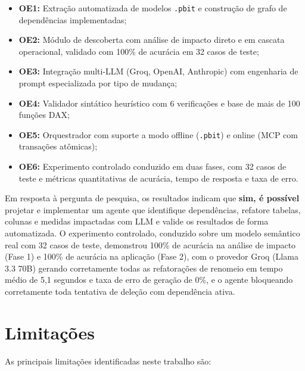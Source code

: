 \documentclass[
    12pt,               %
    openright,          %
    oneside,            %
    a4paper,            %
    chapter=TITLE,      %
    section=TITLE,      %
    brazil              %
]{abntex2}
\begin{document}
\begin{itemize}
    \item \textbf{OE1:} Extração automatizada de modelos \texttt{.pbit} e construção de grafo de dependências implementadas;
    \item \textbf{OE2:} Módulo de descoberta com análise de impacto direto e em cascata operacional, validado com 100\% de acurácia em 32 casos de teste;
    \item \textbf{OE3:} Integração multi-LLM (Groq, OpenAI, Anthropic) com engenharia de prompt especializada por tipo de mudança;
    \item \textbf{OE4:} Validador sintático heurístico com 6 verificações e base de mais de 100 funções DAX;
    \item \textbf{OE5:} Orquestrador com suporte a modo offline (\texttt{.pbit}) e online (MCP com transações atômicas);
    \item \textbf{OE6:} Experimento controlado conduzido em duas fases, com 32 casos de teste e métricas quantitativas de acurácia, tempo de resposta e taxa de erro.
\end{itemize}

Em resposta à pergunta de pesquisa, os resultados indicam que \textbf{sim, é possível} projetar e implementar um agente que identifique dependências, refatore tabelas, colunas e medidas impactadas com LLM e valide os resultados de forma automatizada. O experimento controlado, conduzido sobre um modelo semântico real com 32 casos de teste, demonstrou 100\% de acurácia na análise de impacto (Fase 1) e 100\% de acurácia na aplicação (Fase 2), com o provedor Groq (Llama 3.3 70B) gerando corretamente todas as refatorações de renomeio em tempo médio de 5,1 segundos e taxa de erro de geração de 0\%, e o agente bloqueando corretamente toda tentativa de deleção com dependência ativa.

\section{Limitações}
\label{sec:limitacoes}

As principais limitações identificadas neste trabalho são:
\end{document}
